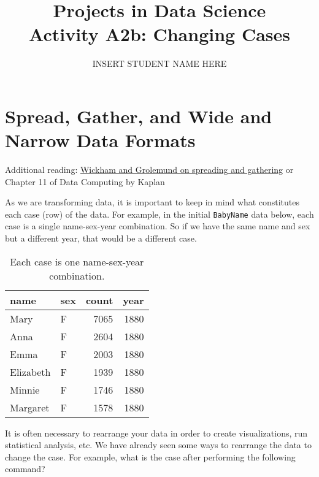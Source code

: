 \documentclass[]{tufte-handout}
\title{Projects in Data Science\\
Activity A2b: Changing Cases}
\author{INSERT STUDENT NAME HERE}
\newenvironment{Shaded}{}{}
\newcommand{\KeywordTok}[1]{\textcolor[rgb]{0.00,0.44,0.13}{\textbf{{#1}}}}
\newcommand{\DataTypeTok}[1]{\textcolor[rgb]{0.56,0.13,0.00}{{#1}}}
\newcommand{\StringTok}[1]{\textcolor[rgb]{0.25,0.44,0.63}{{#1}}}
\newcommand{\NormalTok}[1]{{#1}}
\theoremstyle{definition}
\theoremstyle{definition}
\theoremstyle{definition}
\theoremstyle{remark}
\begin{document}
\maketitle




\section{Spread, Gather, and Wide and Narrow Data
Formats}\label{spread-gather-and-wide-and-narrow-data-formats}

\begin{marginfigure}
Additional reading:
\href{http://r4ds.had.co.nz/tidy-data.html\#spreading-and-gathering}{Wickham
and Grolemund on spreading and gathering} or Chapter 11 of Data
Computing by Kaplan
\end{marginfigure}

As we are transforming data, it is important to keep in mind what
constitutes each case (row) of the data. For example, in the initial
\texttt{BabyName} data below, each case is a single name-sex-year
combination. So if we have the same name and sex but a different year,
that would be a different case.

\begin{table}

\caption{\label{tab:unnamed-chunk-2}Each case is one name-sex-year combination.}
\centering
\begin{tabular}[t]{l|l|r|r}
\hline
name & sex & count & year\\
\hline
Mary & F & 7065 & 1880\\
\hline
Anna & F & 2604 & 1880\\
\hline
Emma & F & 2003 & 1880\\
\hline
Elizabeth & F & 1939 & 1880\\
\hline
Minnie & F & 1746 & 1880\\
\hline
Margaret & F & 1578 & 1880\\
\hline
\end{tabular}
\end{table}

It is often necessary to rearrange your data in order to create
visualizations, run statistical analysis, etc. We have already seen some
ways to rearrange the data to change the case. For example, what is the
case after performing the following command?

\begin{Shaded}
\end{Shaded}
\end{document}
